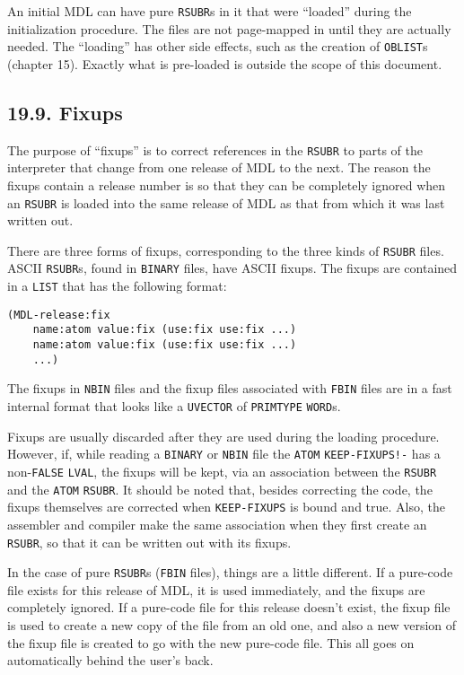 \documentclass[a4paper,]{article}
\begin{document}
An initial MDL can have pure \texttt{RSUBR}s in it that were ``loaded'' during the initialization procedure. The files are
not page-mapped in until they are actually needed. The ``loading'' has other side effects, such as the creation of
\texttt{OBLIST}s (chapter 15). Exactly what is pre-loaded is outside the scope of this document.

\subsection{19.9. Fixups}\label{fixups}

The purpose of ``fixups'' is to correct references in the \texttt{RSUBR} to parts of the interpreter that change from one
release of MDL to the next. The reason the fixups contain a release number is so that they can be completely ignored when
an \texttt{RSUBR} is loaded into the same release of MDL as that from which it was last written out.

There are three forms of fixups, corresponding to the three kinds of \texttt{RSUBR} files. ASCII \texttt{RSUBR}s, found in
\texttt{BINARY} files, have ASCII fixups. The fixups are contained in a \texttt{LIST} that has the following format:

\begin{verbatim}
(MDL-release:fix
    name:atom value:fix (use:fix use:fix ...)
    name:atom value:fix (use:fix use:fix ...)
    ...)
\end{verbatim}

The fixups in \texttt{NBIN} files and the fixup files associated with \texttt{FBIN} files are in a fast internal format
that looks like a \texttt{UVECTOR} of \texttt{PRIMTYPE} \texttt{WORD}s.

Fixups are usually discarded after they are used during the loading procedure. However, if, while reading a \texttt{BINARY}
or \texttt{NBIN} file the \texttt{ATOM} \texttt{KEEP-FIXUPS!-} has a non-\texttt{FALSE}
\texttt{LVAL}, the fixups will be kept, via an association between the \texttt{RSUBR} and the \texttt{ATOM} \texttt{RSUBR}.
It should be noted that, besides correcting the code, the fixups themselves are corrected when \texttt{KEEP-FIXUPS} is
bound and true. Also, the assembler and compiler make the same association when they first create an \texttt{RSUBR}, so
that it can be written out with its fixups.

In the case of pure \texttt{RSUBR}s (\texttt{FBIN} files), things are a little different. If a pure-code file exists for
this release of MDL, it is used immediately, and the fixups are completely ignored. If a pure-code file for this release
doesn't exist, the fixup file is used to create a new copy of the file from an old one, and also a new version of the fixup
file is created to go with the new pure-code file. This all goes on automatically behind the user's back.
\end{document}
